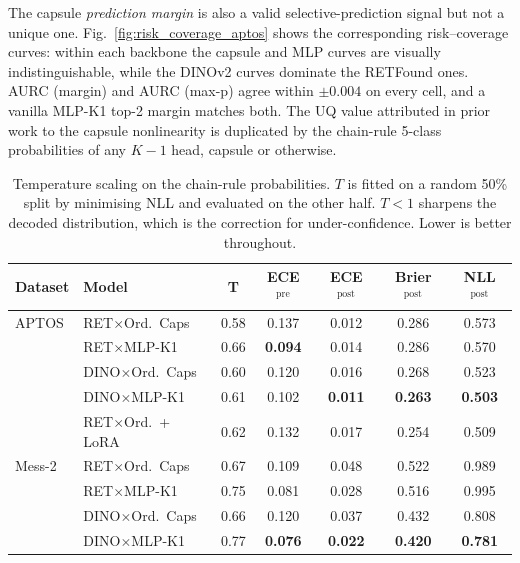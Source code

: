 \documentclass[journal]{IEEEtran}
\begin{document}
The capsule \emph{prediction margin} is also a valid selective-prediction signal but not a unique one. Fig.~\ref{fig:risk_coverage_aptos} shows the corresponding risk--coverage curves: within each backbone the capsule and MLP curves are visually indistinguishable, while the DINOv2 curves dominate the RETFound ones. AURC (margin) and AURC (max-p) agree within $\pm 0.004$ on every cell, and a vanilla MLP-K1 top-2 margin matches both. The UQ value attributed in prior work to the capsule nonlinearity is duplicated by the chain-rule 5-class probabilities of any $K{-}1$ head, capsule or otherwise.

\begin{table}[!t]
    \caption{Temperature scaling on the chain-rule probabilities. $T$ is fitted on a random 50\% split by minimising NLL and evaluated on the other half. $T < 1$ sharpens the decoded distribution, which is the correction for under-confidence. Lower is better throughout.}
    \label{tab:calibration_ts}
    \centering
    \footnotesize
    \begin{tabular}{@{}llccccc@{}}
        \toprule
        Dataset & Model                    & T    & ECE$^{\text{pre}}$ & ECE$^{\text{post}}$ & Brier$^{\text{post}}$ & NLL$^{\text{post}}$ \\
        \midrule
        APTOS   & RET$\times$Ord.\ Caps    & 0.58                & 0.137               & 0.012               & 0.286               & 0.573 \\
                & RET$\times$MLP-K1        & 0.66                & \textbf{0.094}      & 0.014               & 0.286               & 0.570 \\
                & DINO$\times$Ord.\ Caps   & 0.60                & 0.120               & 0.016               & 0.268               & 0.523 \\
                & DINO$\times$MLP-K1       & 0.61                & 0.102               & \textbf{0.011}      & \textbf{0.263}      & \textbf{0.503} \\
                & RET$\times$Ord.\ +\,LoRA & 0.62                & 0.132               & 0.017               & 0.254               & 0.509 \\
        \midrule
        Mess-2  & RET$\times$Ord.\ Caps    & 0.67                & 0.109               & 0.048               & 0.522               & 0.989 \\
                & RET$\times$MLP-K1        & 0.75                & 0.081               & 0.028               & 0.516               & 0.995 \\
                & DINO$\times$Ord.\ Caps   & 0.66                & 0.120               & 0.037               & 0.432               & 0.808 \\
                & DINO$\times$MLP-K1       & 0.77                & \textbf{0.076}      & \textbf{0.022}      & \textbf{0.420}      & \textbf{0.781} \\
        \bottomrule
    \end{tabular}
\end{table}
\end{document}
